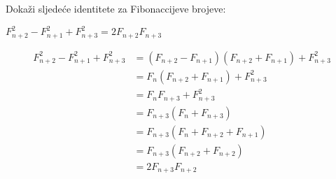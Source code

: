 \documentclass[exam.tex]{subfiles}
\begin{document}
	\begin{subtask}
		Dokaži sljedeće identitete za Fibonaccijeve brojeve:
	
		\( F^2_{n + 2} - F^2_{n + 1} + F^2_{n + 3} = 2 F_{n + 2} F_{n + 3} \)
	\end{subtask}
	
	\begin{align*}
		F^2_{n + 2} - F^2_{n + 1} + F^2_{n + 3} &= (F_{n + 2} - F_{n + 1})(F_{n + 2} + F_{n + 1}) + F^2_{n + 3} \\
		&= F_n (F_{n + 2} + F_{n + 1}) + F^2_{n + 3} \\
		&= F_n F_{n + 3} + F^2_{n + 3} \\
		&= F_{n + 3} ( F_n + F_{n + 3} ) \\
		&= F_{n + 3} ( F_n + F_{n + 2} + F_{n + 1} ) \\
		&= F_{n + 3} ( F_{n + 2} + F_{n + 2} ) \\
		&= 2 F_{n + 3} F_{n + 2} 
	\end{align*}
\end{document}
